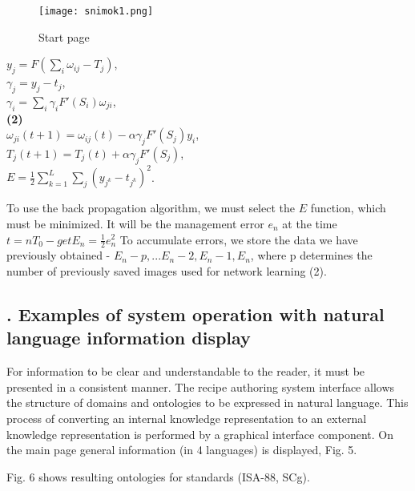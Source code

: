 \documentclass[7pt]{article} \twocolumn
\newcommand{\RomanNumeralCaps}[1]
{\MakeUppercase{\romannumeral #1}} %
\begin{document}
\cfoot{\textbf{\thepage}} %
\setcounter{page}{168} %
\setlength{\columnsep}{0.5cm}
\begin{figure}
    \texttt{[image: snimok1.png]}
    \caption{Start page}
\end{figure}
\vspace{1pt}
\begin{center}
$y_j=F(\displaystyle \sum_{i}\omega_{ij}-T_j)$, \\
$\gamma_j=y_j-t_j$, \\
$\gamma_i=\displaystyle \sum_{i}\gamma_iF'(S_i)\omega_{ji}$, \\
\hspace{7cm} \textbf{(2)} \\
$\omega_{ji}(t+1)=\omega_{ij}(t)-\alpha\gamma_jF'(S_j)y_i$, \\
$T_j(t+1)=T_j(t)+\alpha\gamma_jF'(S_j)$, \\
$E=\displaystyle\frac{1}{2}\displaystyle\sum_{k=1}^L\displaystyle\sum_j(y_{j^k}-t_{j^k})^2$. \end{center} \vspace{0.25cm}


To use the back propagation algorithm, we must select
the $E$ function, which must be minimized. It will be the
management error $e_n$ at the time $t = nT_0 - get  E_n = \frac{1}{2} e^2_n$ To accumulate errors, we store the data we have
previously obtained - $E_n−p, ...E_n−2, E_n−1, E_n$, where
p determines the number of previously saved images used
for network learning (2).
\begin{center}
\section*{\footnotesize \RomanNumeralCaps{5}. Examples of system operation with natural language information display} 
\end{center} \par
For information to be clear and understandable to the
reader, it must be presented in a consistent manner. The
recipe authoring system interface allows the structure of
domains and ontologies to be expressed in natural language. This process of converting an internal knowledge
representation to an external knowledge representation
is performed by a graphical interface component. On
the main page general information (in 4 languages) is
displayed, Fig. 5. \par
Fig. 6 shows resulting ontologies for standards (ISA-88, SCg).
\vspace{0.5cm}
\end{document}
